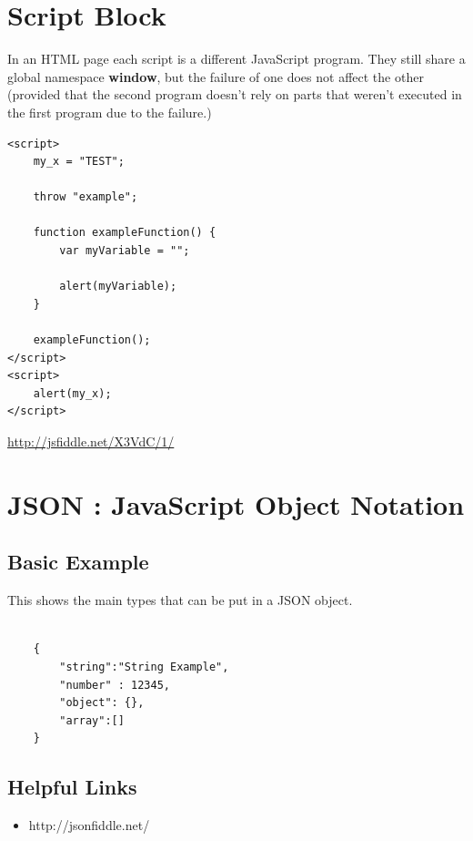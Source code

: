 \documentclass {amsart}
\begin{document}
	
\section{Script Block}
	In an HTML page each script is a different JavaScript program.  They still share a global namespace {\bf window}, but the failure of one does not affect the other (provided that the second program doesn't rely on parts that weren't executed in the first program due to the failure.)

\begin{lstlisting}
<script>
    my_x = "TEST";

    throw "example";

    function exampleFunction() {
        var myVariable = "";

        alert(myVariable);
    }

    exampleFunction();
</script>
<script>
    alert(my_x);
</script>
\end{lstlisting}
\url{http://jsfiddle.net/X3VdC/1/}


\section{JSON : JavaScript Object Notation}

	\subsection {Basic Example}  This shows the main types that can be put in a JSON object. 
	
	\begin{lstlisting}

	{
		"string":"String Example",
   		"number" : 12345,
   		"object": {},
   		"array":[]
  	}

	\end{lstlisting}


\subsection{Helpful Links}
	\begin{itemize}
		\item http://jsonfiddle.net/
	\end{itemize}
\end{document}
